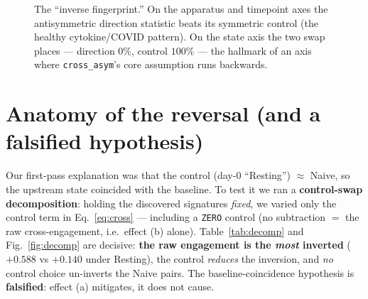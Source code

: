 \documentclass[11pt]{article}
\begin{document}
\begin{figure}[h]
\centering
{}
\caption{The ``inverse fingerprint.'' On the apparatus and timepoint axes the antisymmetric
direction statistic beats its symmetric control (the healthy cytokine/COVID pattern). On the
state axis the two swap places --- direction $0\%$, control $100\%$ --- the hallmark of an
axis where \texttt{cross\_asym}'s core assumption runs backwards.}
\label{fig:bars}
\end{figure}

\section{Anatomy of the reversal (and a falsified hypothesis)}
Our first-pass explanation was that the control (day-0 ``Resting'') $\approx$ Naive, so the
upstream state coincided with the baseline. To test it we ran a \textbf{control-swap
decomposition}: holding the discovered signatures \emph{fixed}, we varied only the control term
in Eq.~\eqref{eq:cross} --- including a \texttt{ZERO} control (no subtraction $=$ the raw
cross-engagement, i.e.\ effect (b) alone). Table~\ref{tab:decomp} and Fig.~\ref{fig:decomp} are
decisive: \textbf{the raw engagement is the \emph{most} inverted} ($+0.588$ vs $+0.140$ under
Resting), the control \emph{reduces} the inversion, and \emph{no} control choice un-inverts the
Naive pairs. The baseline-coincidence hypothesis is \textbf{falsified}: effect (a) mitigates,
it does not cause.
\end{document}
